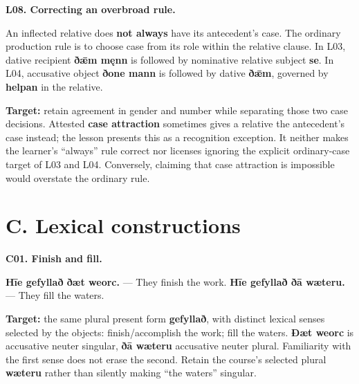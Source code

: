 \par\begin{minipage}{\linewidth}\raggedright
\textbf{L08. Correcting an overbroad rule.}

An inflected relative does \textbf{not always} have its antecedent's case. The ordinary production rule is to choose case from its role within the relative clause. In L03, dative recipient \textbf{ðǣm męnn} is followed by nominative relative subject \textbf{se}. In L04, accusative object \textbf{ðone mann} is followed by dative \textbf{ðǣm}, governed by \textbf{helpan} in the relative.

\textbf{Target:} retain agreement in gender and number while separating those two case decisions. Attested \textbf{case attraction} sometimes gives a relative the antecedent's case instead; the lesson presents this as a recognition exception. It neither makes the learner's “always” rule correct nor licenses ignoring the explicit ordinary-case target of L03 and L04. Conversely, claiming that case attraction is impossible would overstate the ordinary rule.

\end{minipage}\par\addvspace{4pt}

\section*{C. Lexical constructions}

\par\begin{minipage}{\linewidth}\raggedright
\textbf{C01. Finish and fill.}

\textbf{Hīe gefyllað ðæt weorc.} — They finish the work. \textbf{Hīe gefyllað ðā wæteru.} — They fill the waters.

\textbf{Target:} the same plural present form \textbf{gefyllað}, with distinct lexical senses selected by the objects: finish/\allowbreak{}accomplish the work; fill the waters. \textbf{Ðæt weorc} is accusative neuter singular, \textbf{ðā wæteru} accusative neuter plural. Familiarity with the first sense does not erase the second. Retain the course's selected plural \textbf{wæteru} rather than silently making “the waters” singular.

\end{minipage}\par\addvspace{4pt}

